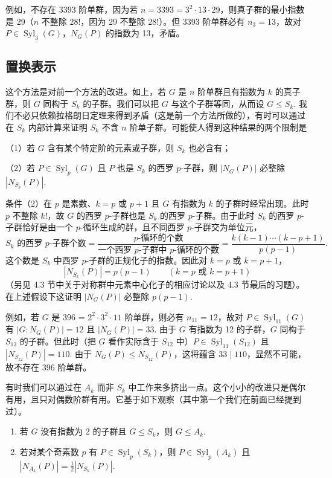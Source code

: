 例如，不存在 3393 阶单群，因为若 \(n = 3393 = 3^2 \cdot 13 \cdot 29\)，则真子群的最小指数是 29（\(n\) 不整除 28!，因为 29 不整除 28!）。但 3393 阶单群必有 \(n_3 = 13\)，故对 \(P \in \operatorname{Syl}_3(G)\)，\(N_G(P)\) 的指数为 13，矛盾。

\subsection*{置换表示}

这个方法是对前一个方法的改进。如上，若 \(G\) 是 \(n\) 阶单群且有指数为 \(k\) 的真子群，则 \(G\) 同构于 \(S_k\) 的子群。我们可以把 \(G\) 与这个子群等同，从而设 \(G \leq S_k\). 我们不必只依赖拉格朗日定理来得到矛盾（这是前一个方法所做的），有时可以通过在 \(S_k\) 内部计算来证明 \(S_k\) 不含 \(n\) 阶单子群。可能使人得到这种结果的两个限制是

（1）若 \(G\) 含有某个特定阶的元素或子群，则 \(S_k\) 也必含有；

（2）若 \(P \in \operatorname{Syl}_p(G)\) 且 \(P\) 也是 \(S_k\) 的西罗 \(p\)-子群，则 \(|N_G(P)|\) 必整除 \(|N_{S_k}(P)|\).

条件（2）在 \(p\) 是素数、\(k = p\) 或 \(p+1\) 且 \(G\) 有指数为 \(k\) 的子群时经常出现。此时 \(p\) 不整除 \(k!\)，故 \(G\) 的西罗 \(p\)-子群也是 \(S_k\) 的西罗 \(p\)-子群。由于此时 \(S_k\) 的西罗 \(p\)-子群恰好是由一个 \(p\)-循环生成的群，且不同西罗 \(p\)-子群交为单位元，
\[
\text{\(S_k\) 的西罗 \(p\)-子群个数} = \frac{\text{\(p\)-循环的个数}}{\text{一个西罗 \(p\)-子群中 \(p\)-循环的个数}} = \frac{k(k-1)\cdots(k-p+1)}{p(p-1)}.
\]
这个数是 \(S_k\) 中西罗 \(p\)-子群的正规化子的指数。因此对 \(k = p\) 或 \(k = p+1\)，
\[
|N_{S_k}(P)| = p(p-1) \qquad (k = p \text{ 或 } k = p+1)
\]
（另见 4.3 节中关于对称群中元素中心化子的相应讨论以及 4.3 节最后的习题）。在上述假设下这证明 \(|N_G(P)|\) 必整除 \(p(p-1)\).

例如，若 \(G\) 是 396 = \(2^2 \cdot 3^2 \cdot 11\) 阶单群，则必有 \(n_{11} = 12\)，故对 \(P \in \operatorname{Syl}_{11}(G)\) 有 \(|G : N_G(P)| = 12\) 且 \(|N_G(P)| = 33\). 由于 \(G\) 有指数为 12 的子群，\(G\) 同构于 \(S_{12}\) 的子群。但此时（把 \(G\) 看作实际含于 \(S_{12}\) 中）\(P \in \operatorname{Syl}_{11}(S_{12})\) 且 \(|N_{S_{12}}(P)| = 110\). 由于 \(N_G(P) \leq N_{S_{12}}(P)\)，这将蕴含 \(33 \mid 110\)，显然不可能，故不存在 396 阶单群。

有时我们可以通过在 \(A_k\) 而非 \(S_k\) 中工作来多挤出一点。这个小小的改进只是偶尔有用，且只对偶数阶群有用。它基于如下观察（其中第一个我们在前面已经提到过）。

\begin{proposition}\label{pro:6.12}
\begin{enumerate}[label=(\arabic*)]
\item 若 \(G\) 没有指数为 2 的子群且 \(G \leq S_k\)，则 \(G \leq A_k\).
\item 若对某个奇素数 \(p\) 有 \(P \in \operatorname{Syl}_p(S_k)\)，则 \(P \in \operatorname{Syl}_p(A_k)\) 且 \(|N_{A_k}(P)| = \frac{1}{2}|N_{S_k}(P)|\).
\end{enumerate}
\end{proposition}

